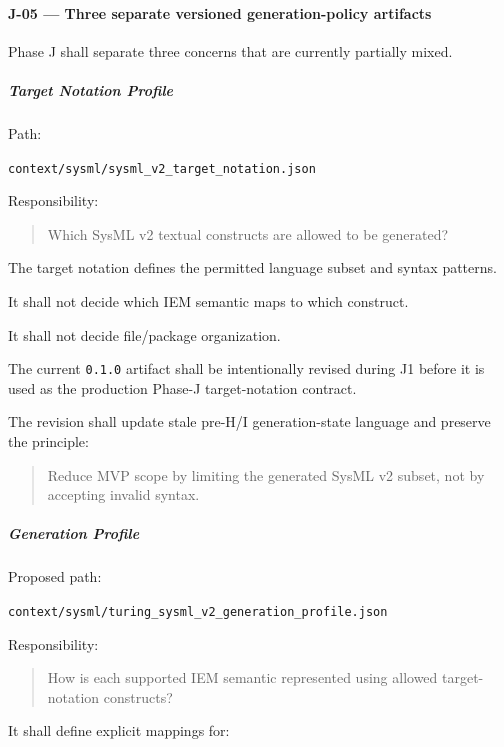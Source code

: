 \hypertarget{j-05--three-separate-versioned-generation-policy-artifacts}{%
\paragraph{J-05 --- Three separate versioned generation-policy artifacts}\label{j-05--three-separate-versioned-generation-policy-artifacts}}

Phase J shall separate three concerns that are currently partially mixed.

\hypertarget{target-notation-profile}{%
\subparagraph{Target Notation Profile}\label{target-notation-profile}}

Path:

\texttt{context/sysml/sysml\_v2\_target\_notation.json}

Responsibility:

\begin{quote}
Which SysML v2 textual constructs are allowed to be generated?
\end{quote}

The target notation defines the permitted language subset and syntax patterns.

It shall not decide which IEM semantic maps to which construct.

It shall not decide file/package organization.

The current \texttt{0.1.0} artifact shall be intentionally revised during J1 before it is used as the production Phase-J target-notation contract.

The revision shall update stale pre-H/I generation-state language and preserve the principle:

\begin{quote}
Reduce MVP scope by limiting the generated SysML v2 subset, not by accepting invalid syntax.
\end{quote}

\hypertarget{generation-profile}{%
\subparagraph{Generation Profile}\label{generation-profile}}

Proposed path:

\texttt{context/sysml/turing\_sysml\_v2\_generation\_profile.json}

Responsibility:

\begin{quote}
How is each supported IEM semantic represented using allowed target-notation constructs?
\end{quote}

It shall define explicit mappings for:

